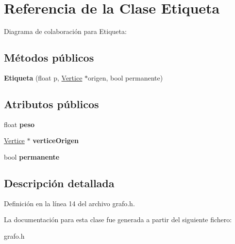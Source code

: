 \hypertarget{classEtiqueta}{}\section{Referencia de la Clase Etiqueta}
\label{classEtiqueta}


Diagrama de colaboración para Etiqueta\+:
\subsection*{Métodos públicos}
\begin{DoxyCompactItemize}
\item 
\mbox{\label{classEtiqueta_aa7f1cc55f5fed8f31cc176d375544349}} 
{\bfseries Etiqueta} (float p, \hyperlink{classVertice}{Vertice} $\ast$origen, bool permanente)
\end{DoxyCompactItemize}
\subsection*{Atributos públicos}
\begin{DoxyCompactItemize}
\item 
\mbox{\label{classEtiqueta_a6cb53a3db11a5f79617642d5a3b1a2fa}} 
float {\bfseries peso}
\item 
\mbox{\label{classEtiqueta_abbc7c11fe50bd7ae2a34949e10e66fff}} 
\hyperlink{classVertice}{Vertice} $\ast$ {\bfseries vertice\+Origen}
\item 
\mbox{\label{classEtiqueta_aa69958b23c24051acace2d464be55de4}} 
bool {\bfseries permanente}
\end{DoxyCompactItemize}


\subsection{Descripción detallada}


Definición en la línea 14 del archivo grafo.\+h.



La documentación para esta clase fue generada a partir del siguiente fichero\+:\begin{DoxyCompactItemize}
\item 
grafo.\+h\end{DoxyCompactItemize}
